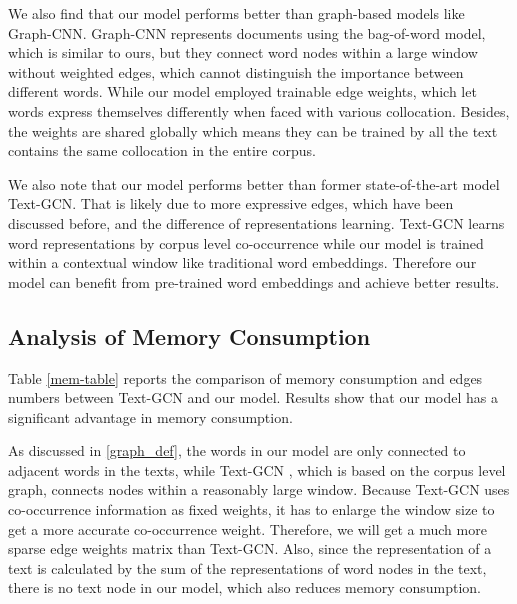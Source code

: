 \documentclass[11pt,a4paper]{article}
\begin{document}
We also find that our model performs better than graph-based models like Graph-CNN. Graph-CNN represents documents using the bag-of-word model, which is similar to ours, but they connect word nodes within a large window without weighted edges, which cannot distinguish the importance between different words. While our model employed trainable edge weights, which let words express themselves differently when faced with various collocation. Besides, the weights are shared globally which means they can be trained by all the text contains the same collocation in the entire corpus. 

We also note that our model performs better than former state-of-the-art model Text-GCN.
That is likely due to more expressive edges, which have been discussed before, and the difference of representations learning. Text-GCN learns word representations by corpus level co-occurrence while our model is trained within a contextual window like traditional word embeddings. 
Therefore our model can benefit from pre-trained word embeddings and achieve better results.



\subsection{Analysis of Memory Consumption}

\begin{table}[t]
\centering
\footnotesize
{}
\caption{\label{mem-table} Comparison of memory consuming. The number of edges in the whole model is in parentheses.}
\end{table}

Table \ref{mem-table} reports the comparison of memory consumption and edges numbers between Text-GCN and our model. Results show that our model has a significant advantage in memory consumption. 

As discussed in \ref{graph_def}, the words in our model are only connected to adjacent words in the texts, while Text-GCN , which is based on the corpus level graph, connects nodes within a reasonably large window. Because Text-GCN uses co-occurrence information as fixed weights, it has to enlarge the window size to get a more accurate co-occurrence weight. Therefore, we will get a much more sparse edge weights matrix than Text-GCN. Also, since the representation of a text is calculated by the sum of the representations of word nodes in the text, there is no text node in our model, which also reduces memory consumption. 
\end{document}
